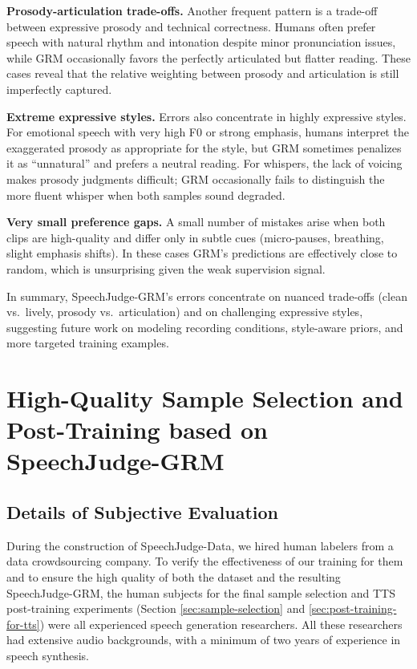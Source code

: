 \documentclass[]{bytedance_seed}
\begin{document}
\textbf{Prosody-articulation trade-offs.}\quad
Another frequent pattern is a trade-off between expressive prosody and
technical correctness.
Humans often prefer speech with natural rhythm and intonation despite minor
pronunciation issues, while GRM occasionally favors the perfectly articulated
but flatter reading.
These cases reveal that the relative weighting between prosody and
articulation is still imperfectly captured.

\textbf{Extreme expressive styles.}\quad
Errors also concentrate in highly expressive styles.
For emotional speech with very high F0 or strong emphasis, humans interpret
the exaggerated prosody as appropriate for the style, but GRM sometimes
penalizes it as ``unnatural'' and prefers a neutral reading.
For whispers, the lack of voicing makes prosody judgments difficult; GRM
occasionally fails to distinguish the more fluent whisper when both samples
sound degraded.

\textbf{Very small preference gaps.}
A small number of mistakes arise when both clips are high-quality and differ
only in subtle cues (micro-pauses, breathing, slight emphasis shifts).
In these cases GRM’s predictions are effectively close to random, which is
unsurprising given the weak supervision signal.

In summary, SpeechJudge-GRM’s errors concentrate on nuanced trade-offs
(clean vs.\ lively, prosody vs.\ articulation) and on challenging expressive
styles, suggesting future work on modeling recording conditions, style-aware
priors, and more targeted training examples.

\section{High-Quality Sample Selection and Post-Training based on SpeechJudge-GRM}

\subsection{Details of Subjective Evaluation}\label{app:sub-eval-details}

During the construction of SpeechJudge-Data, we hired human labelers from a data crowdsourcing company. To verify the effectiveness of our training for them and to ensure the high quality of both the dataset and the resulting SpeechJudge-GRM, the human subjects for the final sample selection and TTS post-training experiments (Section \ref{sec:sample-selection} and \ref{sec:post-training-for-tts}) were all experienced speech generation researchers. All these researchers had extensive audio backgrounds, with a minimum of two years of experience in speech synthesis.
\end{document}
